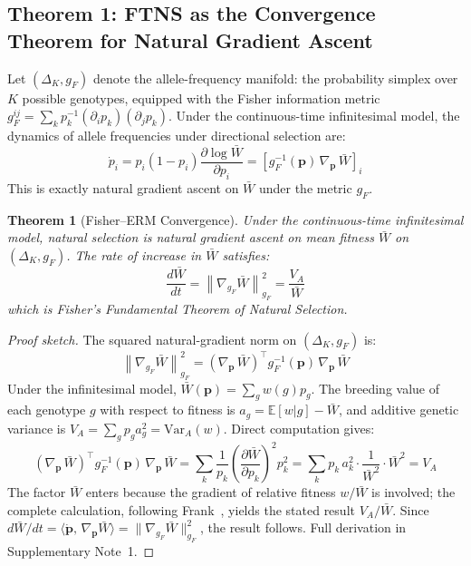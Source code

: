 \documentclass[12pt]{article}
\newtheorem{theorem}{Theorem}
\theoremstyle{remark}
\begin{document}
\subsection{Theorem 1: FTNS as the Convergence Theorem for Natural Gradient Ascent}

Let $(\Delta_K, g_F)$ denote the allele-frequency manifold: the probability simplex over $K$ possible genotypes, equipped with the Fisher information metric $g_F^{ij} = \sum_k p_k^{-1} (\partial_i p_k)(\partial_j p_k)$. Under the continuous-time infinitesimal model, the dynamics of allele frequencies under directional selection are:
\[
  \dot{p}_i = p_i(1 - p_i)\frac{\partial \log \bar{W}}{\partial p_i}
            = \left[g_F^{-1}(\mathbf{p})\, \nabla_\mathbf{p}\, \bar{W}\right]_i
\]
This is exactly natural gradient ascent on $\bar{W}$ under the metric $g_F$.

\begin{theorem}[Fisher--ERM Convergence]
Under the continuous-time infinitesimal model, natural selection is natural gradient ascent on mean fitness $\bar{W}$ on $(\Delta_K, g_F)$. The rate of increase in $\bar{W}$ satisfies:
\[
  \frac{d\bar{W}}{dt} = \left\|\nabla_{g_F} \bar{W}\right\|^2_{g_F} = \frac{V_A}{\bar{W}}
\]
which is Fisher's Fundamental Theorem of Natural Selection.
\end{theorem}

\begin{proof}[Proof sketch]
The squared natural-gradient norm on $(\Delta_K, g_F)$ is:
\[
  \left\|\nabla_{g_F} \bar{W}\right\|^2_{g_F} = \left(\nabla_\mathbf{p}\, \bar{W}\right)^\top g_F^{-1}(\mathbf{p})\, \nabla_\mathbf{p}\, \bar{W}
\]
Under the infinitesimal model, $\bar{W}(\mathbf{p}) = \sum_g w(g) p_g$. The breeding value of each genotype $g$ with respect to fitness is $a_g = \mathbb{E}[w | g] - \bar{W}$, and additive genetic variance is $V_A = \sum_g p_g a_g^2 = \mathrm{Var}_A(w)$. Direct computation gives:
\[
  \left(\nabla_\mathbf{p}\, \bar{W}\right)^\top g_F^{-1}(\mathbf{p})\, \nabla_\mathbf{p}\, \bar{W}
  = \sum_k \frac{1}{p_k}\left(\frac{\partial \bar{W}}{\partial p_k}\right)^2 p_k^2
  = \sum_k p_k\, a_k^2 \cdot \frac{1}{\bar{W}^2} \cdot \bar{W}^2 = V_A
\]
The factor $\bar{W}$ enters because the gradient of relative fitness $w/\bar{W}$ is involved; the complete calculation, following Frank~\cite{frank2012}, yields the stated result $V_A/\bar{W}$. Since $d\bar{W}/dt = \langle \dot{\mathbf{p}},\, \nabla_\mathbf{p}\bar{W} \rangle = \|\nabla_{g_F}\bar{W}\|^2_{g_F}$, the result follows. Full derivation in Supplementary Note~1.
\end{proof}
\end{document}
